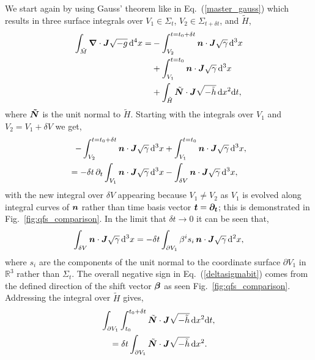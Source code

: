 We start again by using Gauss' theorem like in Eq.~(\ref{master_gauss}) which results in three surface integrals over $V_1\in\Sigma_t$, $V_2\in\Sigma_{t+\delta t}$, and $\tilde{H}$,
\begin{align} \begin{split}
\int_{\tilde{M}} \boldsymbol{\nabla} \cdot \boldsymbol{J} \sqrt{-g} \, \dd^4 x =& -\int^{t=t_0+\delta t}_{V_2} \boldsymbol{n} \cdot \boldsymbol{J} \sqrt{\gamma} \,\dd^3 x \\
                                                             & +\int^{t=t_0}_{V_1} \boldsymbol{n} \cdot \boldsymbol{J} \sqrt{\gamma} \,\dd^3 x \\ 
                                                             & +\int_{\tilde{H}} \tilde{\boldsymbol N} \cdot \boldsymbol{J} \sqrt{-\tilde{h}} \, \dd x^2 \dd t,
\end{split}\end{align}
where $\boldsymbol{\tilde{N}}$ is the unit normal to $\tilde{H}$. Starting with the integrals over $V_1$ and $V_2 = V_1 + \delta V$ we get, 
\begin{align}
-\int^{t=t_0+\delta t}_{V_2} \boldsymbol{n} \cdot \boldsymbol{J} \sqrt{\gamma} \,\dd^3 x  &+\int^{t=t_0}_{V_1} \boldsymbol{n} \cdot \boldsymbol{J} \sqrt{\gamma} \,\dd^3 x, \\ 
 \label{dsigma dt bit}=-\delta t \,\partial_t \int_{V_1} \boldsymbol{n} \cdot \boldsymbol{J} \sqrt{\gamma} \,\dd^3 x  &-\int_{\delta V} \boldsymbol{n} \cdot \boldsymbol{J} \sqrt{\gamma} \,\dd^3 x, 
\end{align}
with the new integral over $\delta V$ appearing because $V_1\neq V_2$ as $V_1$ is evolved along integral curves of $\boldsymbol{n}$ rather than time basis vector $\boldsymbol{t}=\boldsymbol{\partial_t}$; this is demonstrated in Fig.~\ref{fig:qfs_comparison}. In the limit that $\delta t \rightarrow 0$ it can be seen that,
\begin{align} \label{deltasigmabit}
\int_{\delta V} \boldsymbol{n} \cdot \boldsymbol{J} \sqrt{\gamma} \,\dd^3 x = -\delta t \int_{\partial V_1} \beta^i s_i\, \boldsymbol{n} \cdot \boldsymbol{J} \sqrt{\gamma} \,\dd^2 x,
\end{align}
where $s_i$ are the components of the unit normal to the coordinate surface $\partial V_1$ in $\mathbb{R}^3$ rather than $\Sigma_t$. The overall negative sign in Eq.~(\ref{deltasigmabit}) comes from the defined direction of the shift vector $\boldsymbol{\beta}$ as seen Fig.~\ref{fig:qfs_comparison}. Addressing the integral over $\tilde{H}$ gives,  
\begin{align}
 \int_{\partial V_1}\int_{t_0}^{t_0 + \delta t}\tilde{\boldsymbol N} &\cdot \boldsymbol{J} \sqrt{-\tilde{h}} \, \dd x^2 \dd t, \nonumber \\
 \label{htildepart}=\delta t \int_{\partial V_1} \tilde{\boldsymbol N} &\cdot \boldsymbol{J} \sqrt{-\tilde{h}} \, \dd x^2.  
\end{align}
